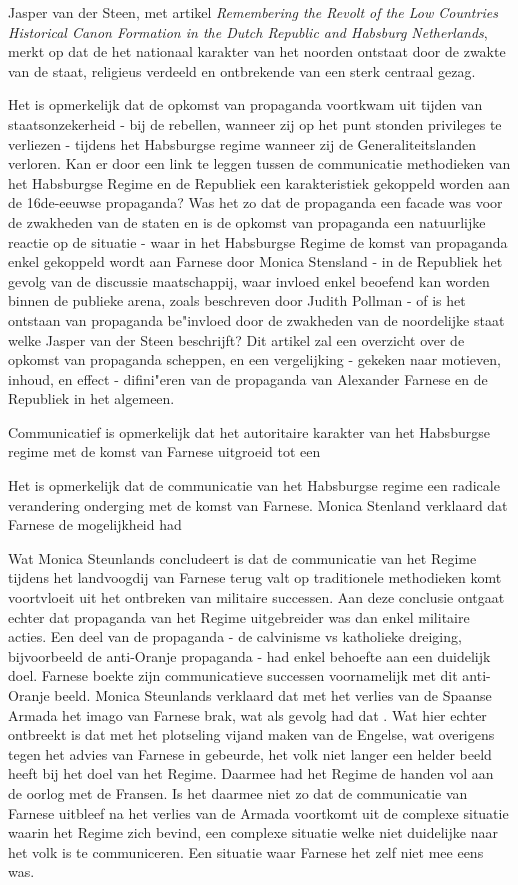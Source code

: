 \documentclass[11pt]{amsart}
\begin{document}
Jasper van der Steen, met artikel \textit{Remembering the Revolt of the Low Countries Historical Canon Formation in the
     Dutch Republic and Habsburg Netherlands}\autocite{vandersteenRememberingRevoltLow2018}, merkt op dat de het nationaal
karakter van het noorden ontstaat door de zwakte van de staat, religieus verdeeld en ontbrekende van een sterk centraal
gezag.

Het is opmerkelijk dat de opkomst van propaganda voortkwam uit tijden van staatsonzekerheid - bij de rebellen, wanneer
zij op het punt stonden privileges te verliezen - tijdens het Habsburgse regime wanneer zij de Generaliteitslanden
verloren. Kan er door een link te leggen tussen de communicatie methodieken van het Habsburgse Regime en de Republiek
een karakteristiek gekoppeld worden aan de 16de-eeuwse propaganda? Was het zo dat de propaganda een facade was voor de
zwakheden van de staten en is de opkomst van propaganda een natuurlijke reactie op de situatie - waar in het Habsburgse
Regime de komst van propaganda enkel gekoppeld wordt aan Farnese door Monica Stensland - in de Republiek het gevolg van
de discussie maatschappij, waar invloed enkel beoefend kan worden binnen de publieke arena, zoals beschreven door
Judith Pollman - of is het ontstaan van propaganda be"invloed door de zwakheden van de noordelijke staat welke Jasper
van der Steen beschrijft? Dit artikel zal een overzicht over de opkomst van propaganda scheppen, en een vergelijking -
gekeken naar motieven, inhoud, en effect - difini"eren van de propaganda van Alexander Farnese en de Republiek in het
algemeen.

Communicatief is opmerkelijk dat het autoritaire karakter van het Habsburgse regime met de komst van Farnese uitgroeid
tot een

Het is opmerkelijk dat de communicatie van het Habsburgse regime een radicale verandering onderging met de komst van
Farnese. Monica Stenland verklaard dat Farnese de mogelijkheid had

Wat Monica Steunlands concludeert is dat de communicatie van het Regime tijdens het landvoogdij van Farnese terug valt
op traditionele methodieken komt voortvloeit uit het ontbreken van militaire successen. Aan deze conclusie ontgaat
echter dat propaganda van het Regime uitgebreider was dan enkel militaire acties. Een deel van de propaganda - de
calvinisme vs katholieke dreiging, bijvoorbeeld de anti-Oranje propaganda - had enkel behoefte aan een duidelijk doel.
Farnese boekte zijn communicatieve successen voornamelijk met dit anti-Oranje beeld. Monica Steunlands verklaard dat
met het verlies van de Spaanse Armada het imago van Farnese brak, wat als gevolg had dat . Wat hier echter ontbreekt is
dat met het plotseling vijand maken van de Engelse, wat overigens tegen het advies van Farnese in gebeurde, het volk
niet langer een helder beeld heeft bij het doel van het Regime. Daarmee had het Regime de handen vol aan de oorlog met
de Fransen. Is het daarmee niet zo dat de communicatie van Farnese uitbleef na het verlies van de Armada voortkomt uit
de complexe situatie waarin het Regime zich bevind, een complexe situatie welke niet duidelijke naar het volk is te
communiceren. Een situatie waar Farnese het zelf niet mee eens was.
\end{document}
